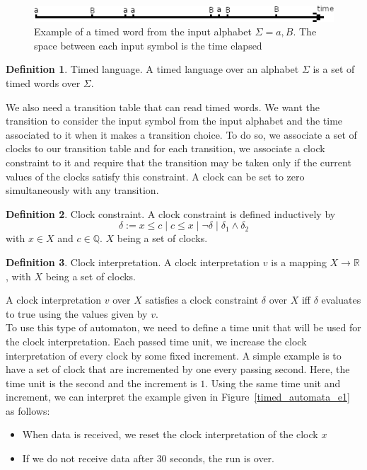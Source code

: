 \documentclass[12pt]{article}
\theoremstyle{definition}
\newtheorem{definition}{Definition}[section]
\theoremstyle{definition}
\theoremstyle{remark}
\newcommand{\R}{\mathbb{R}}
\newcommand{\Q}{\mathbb{Q}}
\begin{document}
\begin{figure}
    \centering
    \includegraphics[scale=3]{timed_word.png}
    \caption{Example of a timed word from the input alphabet $\Sigma = {a, B}$. The space between each input symbol is the time elapsed}
    \label{timed_word}
\end{figure}

\theoremstyle{definition}
\begin{definition}{Timed language.}
A timed language over an alphabet $\Sigma$ is a set of timed words over $\Sigma$.
\end{definition}

We also need a transition table that can read timed words. We want the transition to consider the input symbol from the input alphabet and the time associated to it when it makes a transition choice. To do so, we associate a set of clocks to our transition table and for each transition, we associate a clock constraint to it and require that the transition may be taken only if the current values of the clocks satisfy this constraint. A clock can be set to zero simultaneously with any transition.

\theoremstyle{definition}
\begin{definition}{Clock constraint.} A clock constraint is defined inductively by
$$\delta := x \le c \mid c \le x \mid \neg \delta \mid \delta_1 \land \delta_2$$ with $x \in X$ and $c \in \Q$. $X$ being a set of clocks.
\end{definition}

\theoremstyle{definition}
\begin{definition}{Clock interpretation.} A clock interpretation $v$ is a mapping $X \to \R$, with $X$ being a set of clocks.
\end{definition}

A clock interpretation $v$ over $X$ satisfies a clock constraint $\delta$ over $X$ iff $\delta$ evaluates to true using the values given by $v$.\\

To use this type of automaton, we need to define a time unit that will be used for the clock interpretation. Each passed time unit, we increase the clock interpretation of every clock by some fixed increment. A simple example is to have a set of clock that are incremented by one every passing second. Here, the time unit is the second and the increment is $1$. Using the same time unit and increment, we can interpret the example given in Figure~\ref{timed_automata_e1} as follows:
\begin{itemize}
\item When data is received, we reset the clock interpretation of the clock $x$
\item If we do not receive data after $30$ seconds, the run is over.
\end{itemize}
\end{document}

